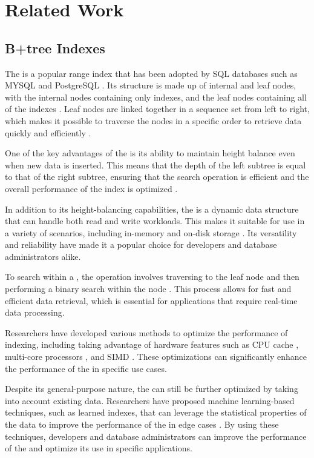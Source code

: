 \section{Related Work}

\subsection{B+tree Indexes}

The \btree is a popular range index that has been adopted by SQL databases such as MYSQL and PostgreSQL \cite{kieseberg2019analysis}. Its structure is made up of internal and leaf nodes, with the internal nodes containing only indexes, and the leaf nodes containing all of the indexes \cite{comer1979ubiquitous}. Leaf nodes are linked together in a sequence set from left to right, which makes it possible to traverse the nodes in a specific order to retrieve data quickly and efficiently \cite{comer1979ubiquitous}.

One of the key advantages of the \btree is its ability to maintain height balance even when new data is inserted. This means that the depth of the left subtree is equal to that of the right subtree, ensuring that the search operation is efficient and the overall performance of the index is optimized \cite{comer1979ubiquitous}.

In addition to its height-balancing capabilities, the \btree is a dynamic data structure that can handle both read and write workloads. This makes it suitable for use in a variety of scenarios, including in-memory and on-disk storage \cite{comer1979ubiquitous}. Its versatility and reliability have made it a popular choice for developers and database administrators alike.

To search within a \btree, the operation involves traversing to the leaf node and then performing a binary search within the node \cite{comer1979ubiquitous}. This process allows for fast and efficient data retrieval, which is essential for applications that require real-time data processing.

Researchers have developed various methods to optimize the performance of \btree indexing, including taking advantage of hardware features such as CPU cache \cite{CSSCSBTree}, multi-core processors \cite{srinivasan1991performance}, and SIMD \cite{FAST}. These optimizations can significantly enhance the performance of the \btree in specific use cases.

Despite its general-purpose nature, the \btree can still be further optimized by taking into account existing data. Researchers have proposed machine learning-based techniques, such as learned indexes, that can leverage the statistical properties of the data to improve the performance of the \btree in edge cases \cite{CasedLearnedIndex}. By using these techniques, developers and database administrators can improve the performance of the \btree and optimize its use in specific applications.

